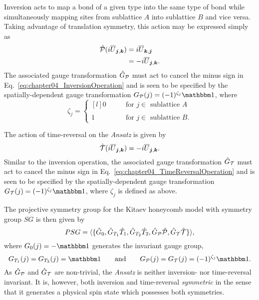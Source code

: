 Inversion acts to map a bond of a given type into the same type of bond while simultaneously mapping sites from sublattice $A$ into sublattice $B$ and vice versa.
Taking advantage of translation symmetry, this action may be expressed simply as
%
\begin{align}
	\hat{\mathcal{P}} (i \overline{U}_{\bm{j}, \bm{k}})	&= i \overline{U}_{\bm{k}, \bm{j}} \nonumber\\
														&= -i \overline{U}_{\bm{j}, \bm{k}}.
	\label{eq:chapter04_InversionOperation}
\end{align}
%
The associated gauge transformation $\hat{G}_{\mathcal{P}}$ must act to cancel the minus sign in Eq.~\eqref{eq:chapter04_InversionOperation} and is seen to be specified by the spatially-dependent gauge transformation $G_{\mathcal{P}}(j) = (-1)^{\zeta_j} \id$, where
%
\begin{equation}
	\zeta_j = \left\{
		\begin{matrix*}[l]
			0 &
			\qquad \text{for $j \in$ sublattice $A$} \\
			&\\
			1 &
			\qquad \text{for $j \in$ sublattice $B$}.
		\end{matrix*}
	\right.
\end{equation}
%

The action of time-reversal on the \textit{Ansatz} is given by
%
\begin{equation}
	\hat{\mathcal{T}} (i \overline{U}_{\bm{j}, \bm{k}}) = -i \overline{U}_{\bm{j}, \bm{k}}.
	\label{eq:chapter04_TimeReversalOperation}
\end{equation}
%
Similar to the inversion operation, the associated gauge transformation $\hat{G}_{\mathcal{T}}$ must act to cancel the minus sign in Eq.~\eqref{eq:chapter04_TimeReversalOperation} and is seen to be specified by the spatially-dependent gauge transformation $G_{\mathcal{T}}(j) = (-1)^{\zeta_j} \id$, where $\zeta_j$ is defined as above.

The projective symmetry group for the Kitaev honeycomb model with symmetry group $SG$ is then given by
%
\begin{equation}
	PSG = \langle \{ \hat{G}_0, \hat{G}_{T_1} \hat{T}_1, \hat{G}_{T_2} \hat{T}_2, \hat{G}_{\mathcal{P}} \hat{\mathcal{P}}, \hat{G}_{\mathcal{T}} \hat{\mathcal{T}} \} \rangle,
\end{equation}
%
where $G_0(j) = -\id$ generates the invariant gauge group,
%
\begin{equation}
	G_{T_1}(j) = G_{T_2}(j) = \id \qquad {\rm and } \qquad G_{\mathcal{P}}(j) = G_{\mathcal{T}}(j) = (-1)^{\zeta_j} \id.
\end{equation}
%
As $\hat{G}_\mathcal{P}$ and $\hat{G}_{\mathcal{T}}$ are non-trivial, the \textit{Ansatz} is neither inversion- nor time-reversal invariant.
It is, however, both inversion and time-reversal \textit{symmetric} in the sense that it generates a physical spin state which possesses both symmetries.

